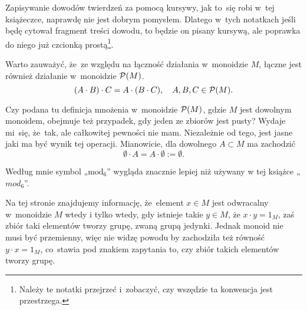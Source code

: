 \documentclass[a4paper,11pt]{article}
\begin{document}
\start Zapisywanie dowodów twierdzeń za pomocą kursywy, jak to~się
robi w~tej książeczce, naprawdę nie jest dobrym pomysłem. Dlatego
w~tych notatkach jeśli będę cytował fragment treści dowodu, to będzie
on pisany kursywą, ale poprawka do niego już czcionką
prostą\footnote{Należy te notatki przejrzeć i~zobaczyć, czy wszędzie
  ta konwencja jest przestrzega.}.

\vspace{\spaceFour}







 Warto zauważyć, że~ze względu na łączność działania
w~monoidzie $M$, łączne jest również działanie w~monoidzie
$\mathcal{P}( M )$.
\begin{equation}
  \label{eq:Forys-Forys-01}
  ( A \cdot B ) \cdot C = A \cdot ( B \cdot C ), \quad
  A, B, C \in \mathcal{P}( M ).
\end{equation}

\vspace{\spaceFour}





 Czy podana tu definicja mnożenia w~monoidzie
$\mathcal{P}( M )$, gdzie $M$ jest dowolnym monoidem, obejmuje też
przypadek, gdy jeden ze zbiorów jest pusty? Wydaje mi~się, że~tak, ale
całkowitej pewności nie mam. Niezależnie od tego, jest jasne jaki ma
być wynik tej operacji. Mianowicie, dla dowolnego $A \subset M$ ma zachodzić
\begin{equation}
  \label{eq:Forys-Forys-02}
  \emptyset \cdot A = A \cdot \emptyset := \emptyset.
\end{equation}

\vspace{\spaceFour}





 Według mnie symbol „$\textrm{mod}_{ 6 }$” wygląda
znacznie lepiej niż używany w tej książce „$mod_{ 6 }$”.

\vspace{\spaceFour}





 Na tej stronie znajdujemy informację, że~element
$x \in M$ jest odwracalny w~monoidzie $M$ wtedy i tylko wtedy, gdy
istnieje takie $y \in M$, że $x \cdot y = 1_{ M }$, zaś zbiór taki
elementów tworzy grupę, zwaną grupą jedynki. Jednak monoid nie musi
być przemienny, więc nie widzę powodu by zachodziła też równość
$y \cdot x = 1_{ M }$, co~stawia pod znakiem zapytania to, czy zbiór
takich elementów tworzy grupę.
\end{document}
